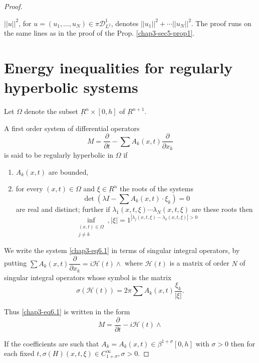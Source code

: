 \begin{proof}
\begin{remark*}%
$|| u ||^2$, for $u=(u_1,\ldots, u_N)\in \pi
  \mathscr{D}^1_{L^{2}}$, denotes $|| u_1||^2+ \cdots || u_N||^2$. 
The proof runs on the same lines as in the proof of the
Prop. \ref{chap3-sec5-prop1}. 
\end{remark*}

\section{Energy inequalities for regularly hyperbolic
  systems}\label{chap3-sec6}%

Let $\Omega$ denote the subset $\underbar{R}^n \times [0, h]$ of
$\underbar{R}^{n+1}$. 

\begin{defi*}%
A first order system of differential operators
\begin{equation*}
M = \frac{\partial}{\partial t} - \sum A_k(x,
t)\frac{\partial}{\partial x_k} \tag{6.1} \label{chap3-eq6.1}
\end{equation*}
is said to be regularly hyperbolic in $\Omega$ if 
\begin{enumerate}
\renewcommand{\labelenumi}{\rm(\theenumi)}
\item $A_k(x, t)$ are bounded,

\item for every $(x, t)\in \Omega$ and $\xi \in
  \underbar{R}^n$ the roots of the systems  
\begin{equation*}
\det  \left(\lambda I - \sum A_k(x,t) \cdot \xi_k\right) = 0
\tag{6.2}\label{chap3-eq6.2} 
\end{equation*}
are real and distinct; further if $\lambda_1(x, t, \xi )\cdots
\lambda_N (x, t, \xi)$ are these roots then  
\begin{equation*}
\inf_{\substack{(x, t)\in \Omega \\ j \neq k }}, | \xi |
=1^{| \lambda_j(x, t, \xi ) -\lambda_k(x, t, \xi ) |>0}
\tag{6.3}\label{chap3-eq6.3} 
\end{equation*}
\end{enumerate}

We write the system \eqref{chap3-eq6.1} in terms of singular integral
operators, by 
putting $\sum A_k (x,t) \dfrac{\partial}{\partial x_k} = i
\mathscr{H}(t)\wedge$ where $\mathscr{H}(t)$ is a matrix of order $N$
of singular integral operators whose symbol is the matrix 
$$
\sigma (\mathscr{H}(t)) = 2 \pi \sum A_k(x,t)\frac{\xi_k}{|\xi|}. 
$$\pageoriginale
\end{defi*}

Thus \eqref{chap3-eq6.1} is written in the form 
\begin{equation*}
M = \frac{\partial}{\partial t}-i \mathscr{H}(t) \wedge \tag*{$6.1)'$} 
\end{equation*}

If the coefficients are such that $A_k = A_k(x, t) \in
\beta^{1+\sigma}[0, h]$ with $\sigma >0$ then for each fixed
$t,\sigma(H)(x, t, \xi)\in C^{\infty}_{1+\sigma},  \sigma >0$. 
\end{proof}

